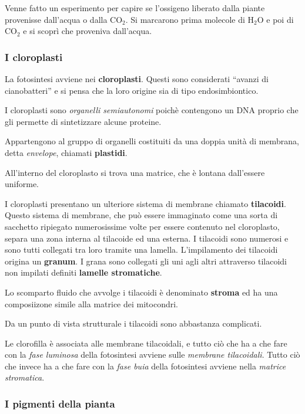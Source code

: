 \documentclass[]{article}
\begin{document}
Venne fatto un esperimento per capire se l'ossigeno liberato dalla
piante provenisse dall'acqua o dalla CO$_2$. Si marcarono prima molecole
di H$_2$O e poi di CO$_2$ e si scoprì che proveniva dall'acqua.

\subsubsection{I cloroplasti}\label{i-cloroplasti}

La fotosintesi avviene nei \textbf{cloroplasti}. Questi sono considerati
``avanzi di cianobatteri'' e si pensa che la loro origine sia di tipo
endosimbiontico.

I cloroplasti sono \emph{organelli semiautonomi} poichè contengono un
DNA proprio che gli permette di sintetizzare alcune proteine.

Appartengono al gruppo di organelli costituiti da una doppia unità di
membrana, detta \emph{envelope}, chiamati \textbf{plastidi}.

All'interno del cloroplasto si trova una matrice, che è lontana
dall'essere uniforme.

I cloroplasti presentano un ulteriore sistema di membrane chiamato
\textbf{tilacoidi}. Questo sistema di membrane, che può essere
immaginato come una sorta di sacchetto ripiegato numerosissime volte per
essere contenuto nel cloroplasto, separa una zona interna al tilacoide
ed una esterna. I tilacoidi sono numerosi e sono tutti collegati tra
loro tramite una lamella. L'impilamento dei tilacoidi origina un
\textbf{granum}. I grana sono collegati gli uni agli altri attraverso
tilacoidi non impilati definiti \textbf{lamelle stromatiche}.

Lo scomparto fluido che avvolge i tilacoidi è denominato \textbf{stroma}
ed ha una composiizone simile alla matrice dei mitocondri.

Da un punto di vista strutturale i tilacoidi sono abbastanza complicati.

Le clorofilla è associata alle membrane tilacoidali, e tutto ciò che ha
a che fare con la \emph{fase luminosa} della fotosintesi avviene sulle
\emph{membrane tilacoidali}. Tutto ciò che invece ha a che fare con la
\emph{fase buia} della fotosintesi avviene nella \emph{matrice
stromatica}.

\subsubsection{I pigmenti della pianta}\label{i-pigmenti-della-pianta}
\end{document}
